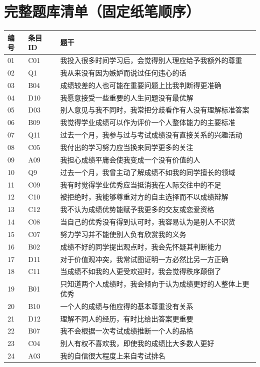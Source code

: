 \documentclass[11pt,a4paper,UTF8,fontset=none]{ctexart}
\begin{document}
\section{完整题库清单（固定纸笔顺序）}
\begin{longtable}{p{0.9cm}p{1.2cm}p{11.1cm}}
\toprule 编号&条目 ID&题干\\\midrule\endhead
01&C01&我投入很多时间学习后，会觉得别人理应给予我额外的尊重\\
02&Q1&我从来没有因为嫉妒而说过任何违心的话\\
03&B04&成绩较差的人也可能在重要问题上比我判断得更准确\\
04&D10&我愿意接受一些重要的人生问题没有最优解\\
05&D03&别人意见与我不同时，我常把分歧看作有人没有理解标准答案\\
06&B09&我觉得学业成绩可以作为评价一个人整体能力的主要标准\\
07&Q11&过去一个月，我参与过与考试成绩没有直接关系的兴趣活动\\
08&C05&我付出的学习努力应当换来同学更多的关注\\
09&A09&我担心成绩平庸会使我变成一个没有价值的人\\
10&Q9&过去一个月，我曾主动了解成绩不如我的同学擅长的领域\\
11&C09&我有时觉得学业优秀应当抵消我在人际交往中的不足\\
12&C10&被拒绝时，我能够尊重对方的自主选择而不以成绩辩解\\
13&C12&我不认为成绩优势能赋予我更多的交友或恋爱资格\\
14&C08&当自己的优秀没有得到认可时，我容易认为是别人不识货\\
15&C07&努力学习并不能使别人负有欣赏我的义务\\
16&B02&成绩不好的同学提出观点时，我会先怀疑其判断能力\\
17&D11&对于价值观冲突，我常试图证明一方必然比另一方正确\\
18&C11&当成绩不如我的人更受欢迎时，我会觉得秩序颠倒了\\
19&B01&只知道两个人成绩时，我会倾向于认为成绩更好的人整体上更优秀\\
20&B10&一个人的成绩与他应得的基本尊重没有关系\\
21&D12&理解不同人的经历，有时比给出答案更重要\\
22&B07&我不会根据一次考试成绩推断一个人的品格\\
23&C04&别人有权不喜欢我，即使我的成绩比大多数人更好\\
24&A03&我的自信很大程度上来自考试排名\\

\end{longtable}
\end{document}
